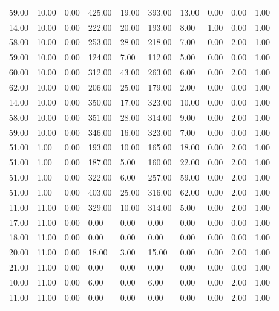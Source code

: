 \begin{table}[h!]
    \centering

    \begin{tabular}{| l l l l l l l l l l |}
        \hline
        59.00 & 10.00 & 0.00 & 425.00 & 19.00 & 393.00 & 13.00 & 0.00 & 0.00 & 1.00 \\
        14.00 & 10.00 & 0.00 & 222.00 & 20.00 & 193.00 & 8.00 & 1.00 & 0.00 & 1.00 \\
        58.00 & 10.00 & 0.00 & 253.00 & 28.00 & 218.00 & 7.00 & 0.00 & 2.00 & 1.00 \\
        59.00 & 10.00 & 0.00 & 124.00 & 7.00 & 112.00 & 5.00 & 0.00 & 0.00 & 1.00 \\
        60.00 & 10.00 & 0.00 & 312.00 & 43.00 & 263.00 & 6.00 & 0.00 & 2.00 & 1.00 \\
        62.00 & 10.00 & 0.00 & 206.00 & 25.00 & 179.00 & 2.00 & 0.00 & 0.00 & 1.00 \\
        14.00 & 10.00 & 0.00 & 350.00 & 17.00 & 323.00 & 10.00 & 0.00 & 0.00 & 1.00 \\
        58.00 & 10.00 & 0.00 & 351.00 & 28.00 & 314.00 & 9.00 & 0.00 & 2.00 & 1.00 \\
        59.00 & 10.00 & 0.00 & 346.00 & 16.00 & 323.00 & 7.00 & 0.00 & 0.00 & 1.00 \\
        51.00 & 1.00 & 0.00 & 193.00 & 10.00 & 165.00 & 18.00 & 0.00 & 2.00 & 1.00 \\
        51.00 & 1.00 & 0.00 & 187.00 & 5.00 & 160.00 & 22.00 & 0.00 & 2.00 & 1.00 \\
        51.00 & 1.00 & 0.00 & 322.00 & 6.00 & 257.00 & 59.00 & 0.00 & 2.00 & 1.00 \\
        51.00 & 1.00 & 0.00 & 403.00 & 25.00 & 316.00 & 62.00 & 0.00 & 2.00 & 1.00 \\
        11.00 & 11.00 & 0.00 & 329.00 & 10.00 & 314.00 & 5.00 & 0.00 & 2.00 & 1.00 \\
        17.00 & 11.00 & 0.00 & 0.00 & 0.00 & 0.00 & 0.00 & 0.00 & 0.00 & 1.00 \\
        18.00 & 11.00 & 0.00 & 0.00 & 0.00 & 0.00 & 0.00 & 0.00 & 0.00 & 1.00 \\
        20.00 & 11.00 & 0.00 & 18.00 & 3.00 & 15.00 & 0.00 & 0.00 & 2.00 & 1.00 \\
        21.00 & 11.00 & 0.00 & 0.00 & 0.00 & 0.00 & 0.00 & 0.00 & 0.00 & 1.00 \\
        10.00 & 11.00 & 0.00 & 6.00 & 0.00 & 6.00 & 0.00 & 0.00 & 2.00 & 1.00 \\
        11.00 & 11.00 & 0.00 & 0.00 & 0.00 & 0.00 & 0.00 & 0.00 & 2.00 & 1.00 \\

\end{tabular}
\end{table}
